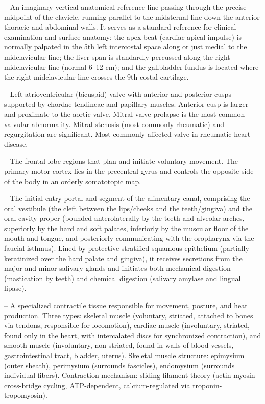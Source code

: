 -- An imaginary vertical anatomical reference line passing through the precise midpoint of the clavicle, running parallel to the midsternal line down the anterior thoracic and abdominal walls. It serves as a standard reference for clinical examination and surface anatomy: the apex beat (cardiac apical impulse) is normally palpated in the 5th left intercostal space along or just medial to the midclavicular line; the liver span is standardly percussed along the right midclavicular line (normal 6--12 cm); and the gallbladder fundus is located where the right midclavicular line crosses the 9th costal cartilage.

-- Left atrioventricular (bicuspid) valve with anterior and posterior cusps supported by chordae tendineae and papillary muscles. Anterior cusp is larger and proximate to the aortic valve. Mitral valve prolapse is the most common valvular abnormality. Mitral stenosis (most commonly rheumatic) and regurgitation are significant. Most commonly affected valve in rheumatic heart disease.

-- The frontal-lobe regions that plan and initiate voluntary movement. The primary motor cortex lies in the precentral gyrus and controls the opposite side of the body in an orderly somatotopic map.

-- The initial entry portal and segment of the alimentary canal, comprising the oral vestibule (the cleft between the lips/cheeks and the teeth/gingiva) and the oral cavity proper (bounded anterolaterally by the teeth and alveolar arches, superiorly by the hard and soft palates, inferiorly by the muscular floor of the mouth and tongue, and posteriorly communicating with the oropharynx via the faucial isthmus). Lined by protective stratified squamous epithelium (partially keratinized over the hard palate and gingiva), it receives secretions from the major and minor salivary glands and initiates both mechanical digestion (mastication by teeth) and chemical digestion (salivary amylase and lingual lipase).

-- A specialized contractile tissue responsible for movement, posture, and heat production. Three types: skeletal muscle (voluntary, striated, attached to bones via tendons, responsible for locomotion), cardiac muscle (involuntary, striated, found only in the heart, with intercalated discs for synchronized contraction), and smooth muscle (involuntary, non-striated, found in walls of blood vessels, gastrointestinal tract, bladder, uterus). Skeletal muscle structure: epimysium (outer sheath), perimysium (surrounds fascicles), endomysium (surrounds individual fibers). Contraction mechanism: sliding filament theory (actin-myosin cross-bridge cycling, ATP-dependent, calcium-regulated via troponin-tropomyosin).

